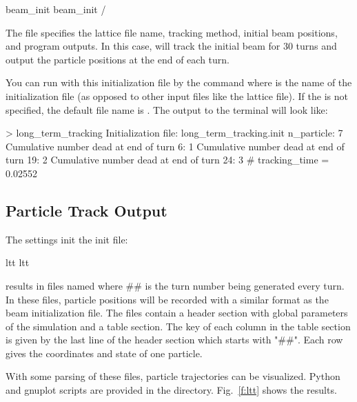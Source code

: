 \documentclass{hitec}     %
\begin{document}
{\begin{code}
  beam_init%
  beam_init%
/
\end{code}

The  file specifies the lattice file name, tracking method, initial beam positions, and program outputs. In this case, \ltt will track the initial beam for 30 turns and output the particle positions at the end of each turn.

You can run \ltt with this initialization file by the command  where  is the name of the  initialization file (as opposed to other input files like the lattice file). If the  is not specified, the default file name is . 
The output to the terminal will look like:
\begin{code}
> long_term_tracking
Initialization file: long_term_tracking.init
n_particle: 7
 Cumulative number dead at end of turn 6: 1
 Cumulative number dead at end of turn 19: 2
 Cumulative number dead at end of turn 24: 3
# tracking_time = 0.02552
\end{code}

\subsection{Particle Track Output}

The settings init the init file:
\begin{code}
  ltt%
  ltt%
\end{code}
results in files named  where \#\# is the turn number being generated every turn. In these files,
particle positions will be recorded with a similar format as the beam initialization file. The files contain a header section with global parameters of the simulation and a table section. The key of each column in the table section is given by the last line of the header section which starts with "\#\#". Each row gives the coordinates and state of one particle.

With some parsing of these files, particle trajectories can be visualized. Python and gnuplot scripts are provided in the  directory. Fig.~\ref{f:ltt} shows the results.

}
\end{document}

